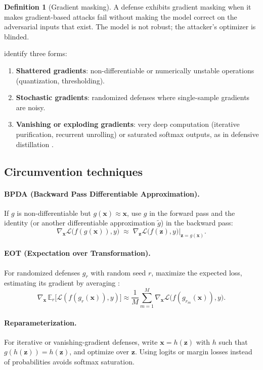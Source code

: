 \documentclass[10pt,a4paper]{extarticle}
\theoremstyle{definition}
\newtheorem{definition}{Definition}[section]
\newcommand{\Loss}{\mathcal{L}}
\newcommand{\x}{\mathbf{x}}
\begin{document}
\begin{definition}[Gradient masking]
A defense exhibits gradient masking when it makes gradient-based attacks fail without making the model correct on the adversarial inputs that exist. The model is not robust; the attacker's optimizer is blinded.
\end{definition}

\citet{athalye2018obfuscated} identify three forms:
\begin{enumerate}
  \item \textbf{Shattered gradients}: non-differentiable or numerically unstable operations (quantization, thresholding).
  \item \textbf{Stochastic gradients}: randomized defenses where single-sample gradients are noisy.
  \item \textbf{Vanishing or exploding gradients}: very deep computation (iterative purification, recurrent unrolling) or saturated softmax outputs, as in defensive distillation \citep{papernot2016distillation}.
\end{enumerate}

\subsection{Circumvention techniques}

\paragraph{BPDA (Backward Pass Differentiable Approximation).} If \(g\) is non-differentiable but \(g(\x)\approx\x\), use \(g\) in the forward pass and the identity (or another differentiable approximation \(\tilde g\)) in the backward pass:
\[
\nabla_{\x}\Loss\big(f(g(\x)),y\big)\;\approx\;\nabla_{\mathbf{z}}\Loss\big(f(\mathbf{z}),y\big)\big|_{\mathbf{z}=g(\x)}.
\]

\paragraph{EOT (Expectation over Transformation).} For randomized defenses \(g_r\) with random seed \(r\), maximize the expected loss, estimating its gradient by averaging \citep{athalye2018eot}:
\[
\nabla_{\x}\,\mathbb{E}_r\big[\Loss(f(g_r(\x)),y)\big]\approx\frac{1}{M}\sum_{m=1}^{M}\nabla_{\x}\Loss\big(f(g_{r_m}(\x)),y\big).
\]

\paragraph{Reparameterization.} For iterative or vanishing-gradient defenses, write \(\x=h(\mathbf{z})\) with \(h\) such that \(g(h(\mathbf{z}))=h(\mathbf{z})\), and optimize over \(\mathbf{z}\). Using logits or margin losses instead of probabilities avoids softmax saturation.
\end{document}
